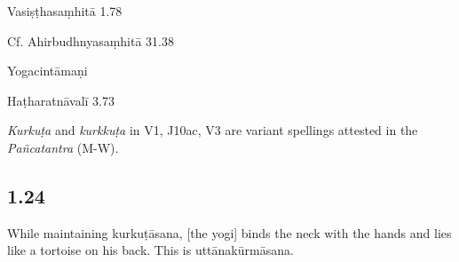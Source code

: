\begin{ekdosis}
\begin{sources}[hp01_023]
Vasiṣṭhasaṃhitā 1.78

\begin{versinnote}
\end{versinnote}

Cf. Ahirbudhnyasaṃhitā 31.38

\begin{versinnote}
\end{versinnote}

\end{sources}

\begin{testimonia}[hp01_023]
Yogacintāmaṇi

\begin{versinnote}
\end{versinnote}

Haṭharatnāvalī 3.73

\begin{versinnote}
\end{versinnote}

\end{testimonia}

\begin{philcomm}[hp01_023]
\emph{Kurkuṭa} and \emph{kurkkuṭa} in V1, J10ac, V3 are variant spellings attested in the \emph{Pañcatantra} (M-W).
\end{philcomm}

\subsection*{1.24}
\begin{translation}[hp01_024]
While maintaining kurkuṭāsana, [the yogi] binds the neck with the hands and lies like a tortoise on his back. This is uttānakūrmāsana.
\end{translation}


\end{ekdosis}
